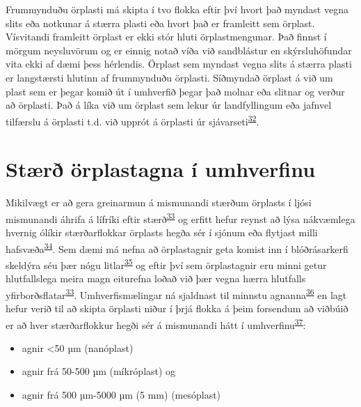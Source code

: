 \documentclass[icelandic,]{book}
\providecommand{\tightlist}{%
  \setlength{\itemsep}{0pt}\setlength{\parskip}{0pt}}
\begin{document}
Frummynduðu örplasti má skipta í tvo flokka eftir því hvort það myndast vegna slits eða notkunar á stærra plasti eða hvort það er framleitt sem örplast. Vísvitandi framleitt örplast er ekki stór hluti örplastmengunar. Það finnst í mörgum neysluvörum og er einnig notað víða við sandblástur en skýrsluhöfundar vita ekki af dæmi þess hérlendis. Örplast sem myndast vegna slits á stærra plasti er langstærsti hlutinn af frummynduðu örplasti. Síðmyndað örplast á við um plast sem er þegar komið út í umhverfið þegar það molnar eða slitnar og verður að örplasti. Það á líka við um örplast sem lekur úr landfyllingum eða jafnvel tilfærslu á örplasti t.d. við upprót á örplasti úr sjávarseti\textsuperscript{\protect\hyperlink{ref-sundt2014sources}{32}}.

\hypertarget{str-orplastagna-i-umhverfinu}{%
\section*{Stærð örplastagna í umhverfinu}\label{str-orplastagna-i-umhverfinu}}

Mikilvægt er að gera greinarmun á mismunandi stærðum örplasts í ljósi mismunandi áhrifa á lífríki eftir stærð\textsuperscript{\protect\hyperlink{ref-velzeboer2014strong}{33}} og erfitt hefur reynst að lýsa nákvæmlega hvernig ólíkir stærðarflokkar örplasts hegða sér í sjónum eða flytjast milli hafsvæða\textsuperscript{\protect\hyperlink{ref-thompson2015microplastics}{34}}. Sem dæmi má nefna að örplastagnir geta komist inn í blóðrásarkerfi skeldýra séu þær nógu litlar\textsuperscript{\protect\hyperlink{ref-browne2008ingested}{35}} og eftir því sem örplastagnir eru minni getur hlutfallslega meira magn eiturefna loðað við þær vegna hærra hlutfalls yfirborðsflatar\textsuperscript{\protect\hyperlink{ref-velzeboer2014strong}{33}}.
Umhverfismælingar ná sjaldnast til minnstu agnanna\textsuperscript{\protect\hyperlink{ref-loder2015methodology}{36}} en lagt hefur verið til að skipta örplasti niður í þrjá flokka á þeim forsendum að viðbúið er að hver stærðarflokkur hegði sér á mismunandi hátt í umhverfinu\textsuperscript{\protect\hyperlink{ref-andrady2011microplastics}{37}}:

\begin{itemize}
\tightlist
\item
  agnir \textless{}50 µm (nanóplast)
\item
  agnir frá 50-500 µm (míkróplast) og
\item
  agnir frá 500 µm-5000 µm (5 mm) (mesóplast)
\end{itemize}
\end{document}
